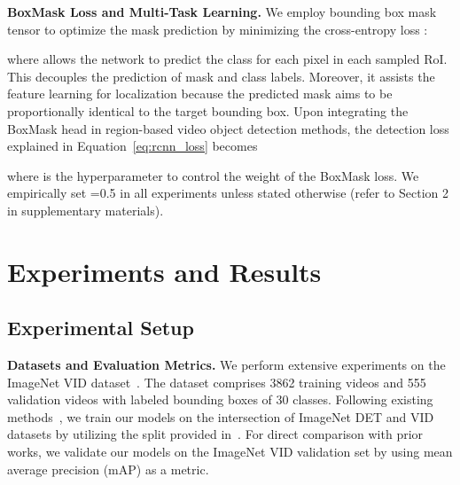\documentclass[10pt,twocolumn,letterpaper]{article}
\begin{document}
\vspace{3pt}
\noindent \textbf{BoxMask Loss and Multi-Task Learning.}
We employ bounding box mask tensor  to optimize the mask prediction by minimizing the cross-entropy loss :

where  allows the network to predict the class for each pixel in each sampled RoI. This decouples the prediction of mask and class labels. Moreover, it assists the feature learning for localization because the predicted mask aims to be proportionally identical to the target bounding box. Upon integrating the BoxMask head in region-based video object detection methods, the detection loss explained in Equation~\ref{eq:rcnn_loss} becomes

where  is the hyperparameter to control the weight of the BoxMask loss. We empirically set =0.5 in all experiments unless stated otherwise (refer to Section 2 in supplementary materials). 

\section{Experiments and Results}

\subsection{Experimental Setup}

\vspace{3pt}
\noindent \textbf{Datasets and Evaluation Metrics.}
We perform extensive experiments on the ImageNet VID dataset~\cite{russakovsky2015imagenet}. The dataset comprises 3862 training videos and 555 validation videos with labeled bounding boxes of 30 classes. Following existing methods~\cite{wu2019sequence, gong2021temporal, zhu2017flow, zhu2017deep}, we train our models on the intersection of ImageNet DET and VID datasets\cite{russakovsky2015imagenet} by utilizing the split provided in~\cite{zhu2017flow}. For direct comparison with prior works, we validate our models on the ImageNet VID validation set by using mean average precision (mAP) as a metric. 
\end{document}
